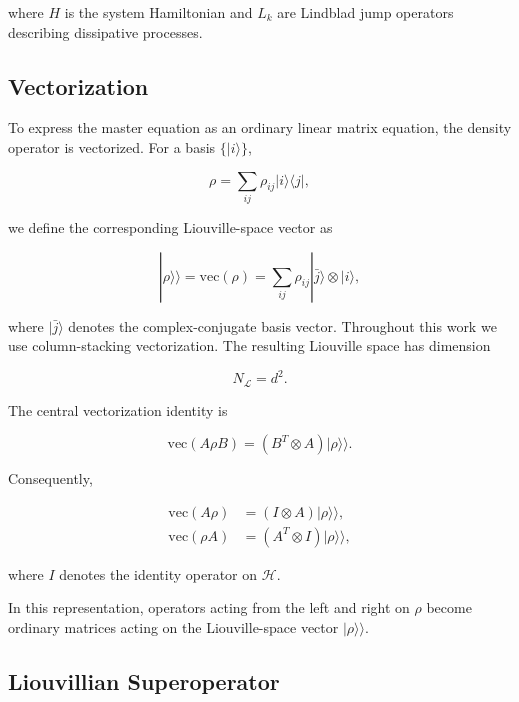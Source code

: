 \documentclass[11pt]{article}
\begin{document}
where $H$ is the system Hamiltonian and $L_k$ are Lindblad jump
operators describing dissipative processes.


\subsection{Vectorization}

To express the master equation as an ordinary linear matrix equation,
the density operator is vectorized. For a basis $\{|i\rangle\}$,

\begin{equation}
\rho
=
\sum_{ij}
\rho_{ij}
|i\rangle\langle j|,
\end{equation}

we define the corresponding Liouville-space vector as

\begin{equation}
|\rho\rangle\rangle
=
\mathrm{vec}(\rho)
=
\sum_{ij}
\rho_{ij}
|\bar{j}\rangle\otimes|i\rangle,
\label{eq:vectorization}
\end{equation}

where $|\bar{j}\rangle$ denotes the complex-conjugate basis vector.
Throughout this work we use column-stacking vectorization. The
resulting Liouville space has dimension

\begin{equation}
N_{\mathcal{L}}=d^2.
\end{equation}

The central vectorization identity is

\begin{equation}
\mathrm{vec}(A\rho B)
=
\left(
B^{T}\otimes A
\right)
|\rho\rangle\rangle.
\label{eq:vec_identity}
\end{equation}

Consequently,

\begin{align}
\mathrm{vec}(A\rho)
&=
(I\otimes A)|\rho\rangle\rangle,
\\
\mathrm{vec}(\rho A)
&=
(A^{T}\otimes I)|\rho\rangle\rangle,
\end{align}

where $I$ denotes the identity operator on $\mathcal{H}$.

In this representation, operators acting from the left and right on
$\rho$ become ordinary matrices acting on the Liouville-space vector
$|\rho\rangle\rangle$.


\subsection{Liouvillian Superoperator}
\end{document}
